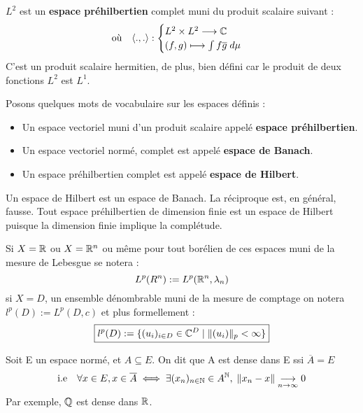 \begin{theorem}[Structure de $L^2$]
    $L^2$ est un \textbf{espace préhilbertien} complet muni du produit scalaire suivant :
    \[ \text{où} \quad \langle .,. \rangle : 
        \begin{cases}
            L^2 \times L^2 \longrightarrow \mathbb{C} \\ 
            (f,g) \longmapsto \int f \overline{g} \; d \mu 
        \end{cases}
    \]
    C'est un produit scalaire hermitien, de plus, bien défini car le produit de deux fonctions $L^2$ est $L^1$. 
\end{theorem}

\begin{remark} Posons quelques mots de vocabulaire sur les espaces définis :
    \begin{itemize}
        \item Un espace vectoriel muni d'un produit scalaire appelé \textbf{espace préhilbertien}.
        \item Un espace vectoriel normé, complet est appelé \textbf{espace de Banach}. 
        \item Un espace préhilbertien complet est appelé \textbf{espace de Hilbert}.
    \end{itemize}
\end{remark}

\begin{remark}
    Un espace de Hilbert est un espace de Banach. La réciproque est, en général, fausse. 
    Tout espace préhilbertien de dimension finie est un espace de Hilbert puisque la dimension finie implique la complétude. 
\end{remark}

\begin{example}
    Si $X = \mathbb{R}$ ou $X = \mathbb{R}^n$ ou même pour tout borélien de ces espaces muni de la mesure de Lebesgue se notera :
        \[ L^p(R^n) := L^p(\mathbb{R}^n, \lambda_n) \] 
    si $X = D$, un ensemble dénombrable muni de la mesure de comptage on notera $l^p(D) := L^p(D,c)$ et plus formellement :
        \[ \boxed{ l^p(D) := \{ (u_i)_{i \in D} \in \mathbb{C}^D \; | \; \|(u_i)\|_p < \infty \} }\] 
\end{example}

\begin{remark}
    Soit E un espace normé, et $A \subseteq E$. 
    On dit que A est dense dans E ssi $\overline{A} = E$ 
    \[ \text{i.e} \quad 
        \forall x \in E, x \in \overline{A} \; 
        \Longleftrightarrow \; \exists (x_n)_{n \in \mathbb{N}} \in A^{\mathbb{N}}, \; \| x_n - x \| \underset{n \to \infty}{\longrightarrow} 0 
    \] 
    Par exemple, $\mathbb{Q}$ est dense dans $\mathbb{R}$. 
\end{remark}

